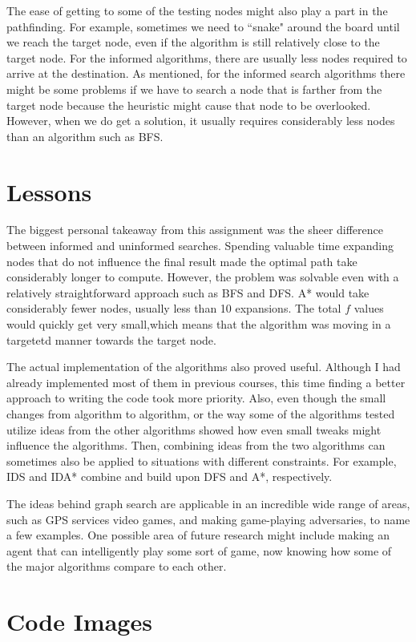 \documentclass{article}
\begin{document}
	The ease of getting to some of the testing nodes might also play a part in the pathfinding. 
	For example, sometimes we need to ``snake" around the board until we reach the target node, even if 
	the algorithm is still relatively close to the target node. For the informed algorithms, there are
	usually less nodes required to arrive at the destination. As mentioned, for the informed search 
	algorithms there might be some problems if we have to search a node that is farther from the target
	node because the heuristic might cause that node to be overlooked. However, when we do get a 
	solution, it usually requires considerably less nodes than an algorithm such as BFS.

\section{Lessons}
	The biggest personal takeaway from this assignment was the sheer difference between informed and 
	uninformed searches. Spending valuable time expanding nodes that do not influence the final 
	result made the optimal path take considerably longer to compute. However, the problem was 
	solvable even with a relatively straightforward approach such as BFS and DFS. A* would take 
	considerably fewer nodes, usually less than 10 expansions. The total $f$ values would quickly 
	get very small,which means that the algorithm was moving in a targetetd manner towards the
	target node.

	The actual implementation of the algorithms also proved useful. Although I had already 
	implemented most of them in previous courses, this time finding a better approach to writing the
	code took more priority. Also, even though the small changes from algorithm to algorithm, or the
	way some of the algorithms tested utilize ideas from the other algorithms showed how even small 
	tweaks might influence the algorithms. Then, combining ideas from the two algorithms can sometimes
	also be applied to situations with different constraints. For example, IDS and IDA* combine 
	and build upon DFS and A*, respectively.

	The ideas behind graph search are applicable in an incredible wide range of areas, such as 
	GPS services video games, and making game-playing adversaries, to name a few examples. One 
	possible area of future research might include making an agent that can intelligently play 
	some sort of game, now knowing how some of the major algorithms compare to each other. 
\section{Code Images}
\end{document}
